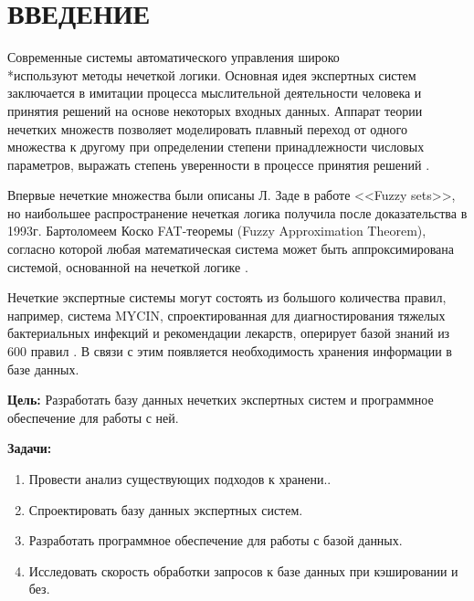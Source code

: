 \section*{ВВЕДЕНИЕ}
Современные системы автоматического управления широко \\*используют методы нечеткой логики. Основная идея экспертных систем заключается в имитации процесса мыслительной деятельности человека и принятия решений на основе некоторых входных данных. Аппарат теории нечетких множеств позволяет моделировать плавный переход от одного множества к другому при определении степени принадлежности числовых параметров, выражать степень уверенности в процессе принятия решений \cite{IncrEfficiency}.

Впервые нечеткие множества были описаны Л. Заде в работе <<Fuzzy sets>>, но наибольшее распространение нечеткая логика получила после доказательства в 1993г. Бартоломеем Коско FAT-теоремы (Fuzzy Approximation Theorem), согласно которой любая математическая система может быть аппроксимирована системой, основанной на нечеткой логике \cite{designadaptive}.

Нечеткие экспертные системы могут состоять из большого количества правил, например, система MYCIN, спроектированная для диагностирования тяжелых бактериальных инфекций и рекомендации лекарств, оперирует базой знаний из 600 правил \cite{MedicineExpSys}. В связи с этим появляется необходимость хранения информации в базе данных.

\textbf{Цель:} Разработать базу данных нечетких экспертных систем и программное обеспечение для работы с ней.

\textbf{Задачи:}
\begin{enumerate}
	\item Провести анализ существующих подходов к хранени..
	\item Спроектировать базу данных экспертных систем.
	\item Разработать программное обеспечение для работы с базой данных.
	\item Исследовать скорость обработки запросов к базе данных при кэшировании и без.
\end{enumerate}

\pagebreak